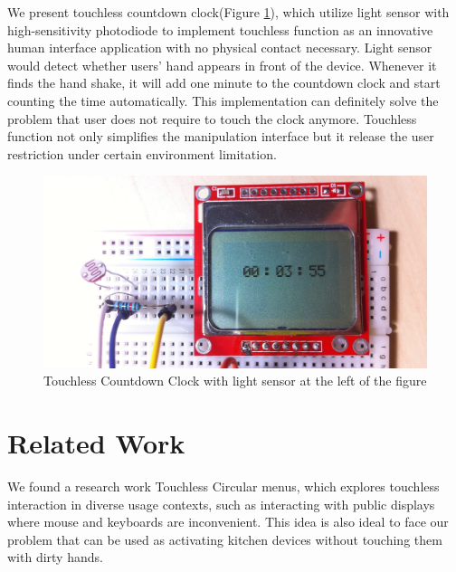 \documentclass{sig-alternate-ipsn13}
\begin{document}
We present touchless countdown clock(Figure \ref{fig:demo1}), which utilize light sensor with high-sensitivity photodiode to implement touchless function as an innovative human interface application with no physical contact necessary.
Light sensor would detect whether users' hand appears in front of the device. Whenever it finds the hand shake, it will add one minute to the countdown clock and start counting the time automatically. This implementation can definitely solve the problem that user does not require to touch the clock anymore. Touchless function not only simplifies the manipulation interface but it release the user restriction under certain environment limitation.
 




\begin{figure}
  \centering
  \includegraphics[width=0.9\linewidth]{Figures/demo1.jpg}
  \caption{Touchless Countdown Clock with light sensor at the left of the figure}
  \label{fig:demo1}
\end{figure}

\section{Related Work}
We found a research work Touchless Circular menus\cite{cite1}, which explores touchless interaction in diverse usage contexts, such as interacting with public displays where mouse and keyboards are inconvenient. This idea is also ideal to face our problem that can be used as activating kitchen devices without touching them with dirty hands.
\end{document}
